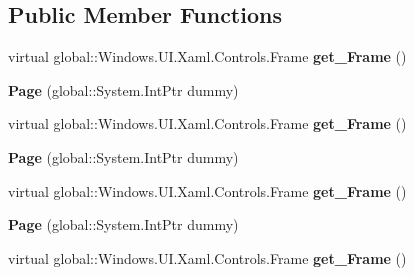 \subsection*{Public Member Functions}
\begin{DoxyCompactItemize}
\item 
\mbox{\label{class_windows_1_1_u_i_1_1_xaml_1_1_controls_1_1_page_ad1c97890c409b005da06716753f1f058}} 
virtual global\+::\+Windows.\+U\+I.\+Xaml.\+Controls.\+Frame {\bfseries get\+\_\+\+Frame} ()
\item 
\mbox{\label{class_windows_1_1_u_i_1_1_xaml_1_1_controls_1_1_page_a0d54095b2451655f71d73e2e865fb3d9}} 
{\bfseries Page} (global\+::\+System.\+Int\+Ptr dummy)
\item 
\mbox{\label{class_windows_1_1_u_i_1_1_xaml_1_1_controls_1_1_page_ad1c97890c409b005da06716753f1f058}} 
virtual global\+::\+Windows.\+U\+I.\+Xaml.\+Controls.\+Frame {\bfseries get\+\_\+\+Frame} ()
\item 
\mbox{\label{class_windows_1_1_u_i_1_1_xaml_1_1_controls_1_1_page_a0d54095b2451655f71d73e2e865fb3d9}} 
{\bfseries Page} (global\+::\+System.\+Int\+Ptr dummy)
\item 
\mbox{\label{class_windows_1_1_u_i_1_1_xaml_1_1_controls_1_1_page_ad1c97890c409b005da06716753f1f058}} 
virtual global\+::\+Windows.\+U\+I.\+Xaml.\+Controls.\+Frame {\bfseries get\+\_\+\+Frame} ()
\item 
\mbox{\label{class_windows_1_1_u_i_1_1_xaml_1_1_controls_1_1_page_a0d54095b2451655f71d73e2e865fb3d9}} 
{\bfseries Page} (global\+::\+System.\+Int\+Ptr dummy)
\item 
\mbox{\label{class_windows_1_1_u_i_1_1_xaml_1_1_controls_1_1_page_ad1c97890c409b005da06716753f1f058}} 
virtual global\+::\+Windows.\+U\+I.\+Xaml.\+Controls.\+Frame {\bfseries get\+\_\+\+Frame} ()
\item 
\mbox{\label{class_windows_1_1_u_i_1_1_xaml_1_1_controls_1_1_page_a0d54095b2451655f71d73e2e865fb3d9}} 

\end{DoxyCompactItemize}
